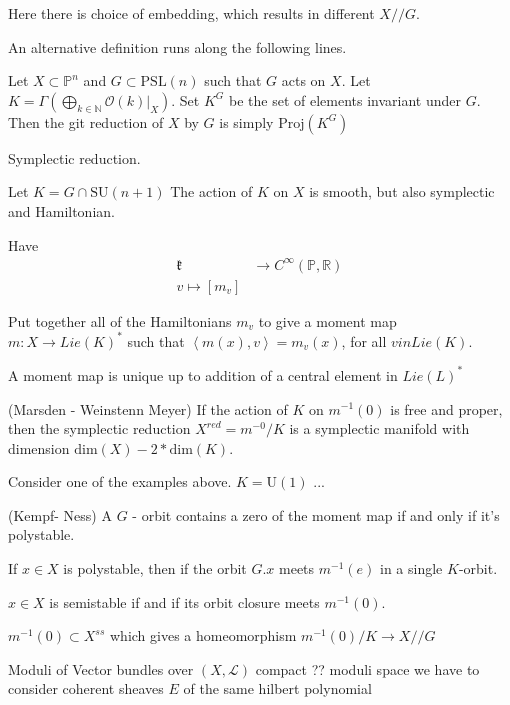 Here there is choice of embedding, which results in different $X//G$. 

An alternative definition runs along the following lines. 

Let $X \subset \mathbb{P} ^n $ and $ G \subset \mathrm{PSL} (n) $ such that $ G $ acts on $ X $.
Let $ K = \Gamma (\bigoplus_{k \in \mathbb{N} }  \mathcal{O}(k)|_X  ) $. 
Set $ K ^G $ be the set of elements invariant under $G$. 
Then the git reduction of $ X$ by $G$ is simply $ \mathrm{Proj}(K^G)$ 


Symplectic reduction. 

Let $ K = G \cap \mathrm{SU}(n+1) $ 
The action of $ K $ on $ X$ is smooth, but also symplectic and Hamiltonian. 

Have 
\begin{align}
    \mathfrak{k} & \rightarrow  C^\infty ( \mathbb{P} , \mathbb{R} ) \\
    v \mapsto [ m_v] 
\end{align}

Put together all of the Hamiltonians $ m_v $ to give a moment map $ m : X \rightarrow  Lie(K) ^* $
such that $\left< m(x) , v \right> = m_v(x) $, for all $ v in Lie (K) $. 

A moment map is unique up to addition of a central element in $Lie (L) ^*$ 

\begin{theorem}
 
    (Marsden - Weinstenn Meyer) 
    If the action of $K$ on $m^{-1}(0) $ is free and proper, 
    then the symplectic reduction $ X ^{red} = m^{-0} /K $ 
    is a symplectic manifold with dimension $ \mathrm{dim}(X) - 2 * \mathrm{dim}(K) $. 
\end{theorem}


Consider one of the examples above. 
$K = \mathrm{U} (1) $ ...

\begin{theorem}
 (Kempf- Ness) 
    A $ G $ - orbit contains a zero of the moment map if and only if it's polystable. 

    If $ x \in X $ is polystable, then if the orbit $ G . x $ meets $ m^{-1} (e) $ in a single $K$-orbit.

    $x \in X $ is semistable if and if its orbit closure meets $ m^{-1} (0) $. 

    $m^{-1} ( 0) \subset X ^{ss} $ which gives a homeomorphism 
    $m^{-1} (0) / K \rightarrow X//G $
\end{theorem}


Moduli of Vector bundles over $ (X, \mathcal{L} ) $
compact ?? moduli space we have to consider coherent sheaves $E$ of the same hilbert polynomial 


